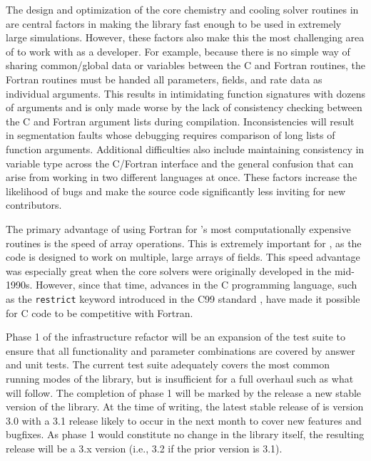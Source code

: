 The design and optimization of the core chemistry and cooling solver
routines in \grackle{} are central factors in making the library fast
enough to be used in extremely large simulations.  However, these
factors also make this the most challenging area of \grackle{} to
work with as a developer.  For example, because there is no simple way
of sharing common/global data or variables between the C and Fortran
routines, the Fortran routines must be handed all parameters, fields,
and rate data as individual arguments.  This results in intimidating
function signatures with dozens of arguments and is only made worse by
the lack of consistency checking between the C and Fortran argument
lists during compilation.  Inconsistencies will result in segmentation
faults whose debugging requires comparison of long lists of function
arguments.  Additional difficulties also include maintaining
consistency in variable type across the C/Fortran interface and the
general confusion that can arise from working in two different
languages at once.  These factors increase the likelihood of bugs and
make the source code significantly less inviting for new
contributors.

The primary advantage of using Fortran for \grackle{}'s most
computationally expensive routines is the speed of array operations.
This is extremely important for \grackle{}, as the code is designed to
work on multiple, large arrays of fields.  This speed advantage was
especially great when the core solvers were originally developed in
the mid-1990s.  However, since that time, advances in the C
programming language, such as the \texttt{restrict} keyword introduced
in the C99 standard \citep{c99}, have made it possible for C code to
be competitive with Fortran.

Phase 1 of the infrastructure refactor will be an expansion of the
test suite to ensure that all functionality and parameter
combinations are covered by answer and unit tests.  The current
test suite adequately covers the most common running modes of the
library, but is insufficient for a full overhaul such as what will
follow.  The completion of phase 1 will be marked by
the release a new stable version of the library.  At the time of
writing, the latest stable release of \grackle{} is version 3.0 with a
3.1 release likely to occur in the next month to cover new features
and bugfixes.  As phase 1 would constitute no change in the library
itself, the resulting release will be a 3.x version (i.e., 3.2 if the
prior version is 3.1).

